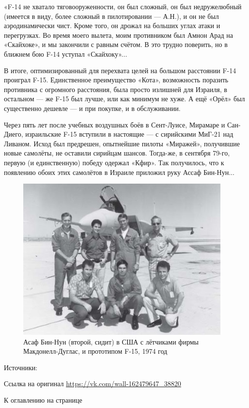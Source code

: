 «F-14 не хватало тяговооруженности, он был сложный, он был недружелюбный (имеется в виду, более сложный в пилотировании — А.Н.), и он не был аэродинамически чист. Кроме того, он дрожал на больших углах атаки и перегрузках. Во время моего вылета, моим противником был Амнон Арад на «Скайхоке», и мы закончили с равным счётом. В это трудно поверить, но в ближнем бою F-14 уступал «Скайхоку»...

В итоге, оптимизированный для перехвата целей на большом расстоянии F-14 проиграл F-15. Единственное преимущество «Кота», возможность поразить противника с огромного расстояния, была просто излишней для Израиля, в остальном — же F-15 был лучше, или как минимум не хуже. А ещё «Орёл» был существенно дешевле — и при покупке, и в обслуживании.

Через пять лет после учебных воздушных боёв в Сент-Луисе, Мирамаре и Сан-Диего, израильские F-15 вступили в настоящие — с сирийскими МиГ-21 над Ливаном. Исход был предрешен, опытнейшие пилоты «Миражей», получившие новые самолёты, не оставили сирийцам шансов. Тогда-же, в сентября 79-го, первую (и единственную) победу одержал «Кфир». Так получилось, что к появлению обоих этих самолётов в Израиле приложил руку Ассаф Бин-Нун...

\begin{figure}[h!tb] 
	\centering\includegraphics[scale=0.8]{History_BenNun/eccw4mb3YRI.jpg}
	\caption{Асаф Бин-Нун (второй, сидит) в США с лётчиками фирмы Макдонелл-Дуглас, и прототипом F-15, 1974 год}%
\end{figure}

Источники: \cite{bennun_inter,segev,misnikov,kuper_nikole}

Ссылка на оригинал \url{https://vk.com/wall-162479647_38820}

К оглавлению на странице \pageref{tablecont}